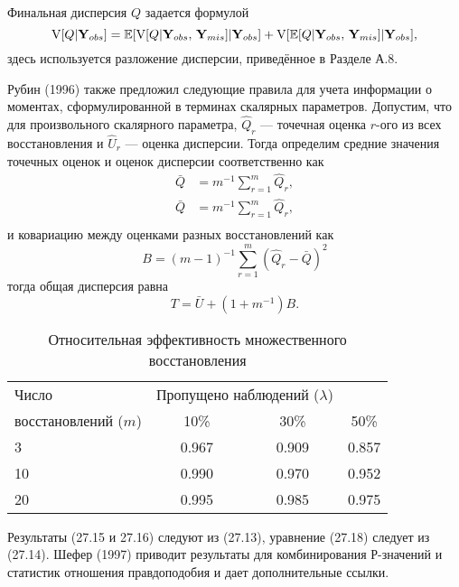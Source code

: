 Финальная дисперсия $Q$ задается формулой
\begin{equation}
\mathrm{V}[Q|\mathbf{Y}_{obs}]=\mathbb{E}[\mathrm{V}[Q|\mathbf{Y}_{obs}, \, \mathbf{Y}_{mis}]|\mathbf{Y}_{obs}]+ \mathrm{V}[\mathbb{E}[Q|\mathbf{Y}_{obs}, \, \mathbf{Y}_{mis}]|\mathbf{Y}_{obs}],
\end{equation}
здесь используется разложение дисперсии, приведённое в Разделе А.8.

Рубин (1996) также предложил следующие правила для учета информации о моментах, сформулированной в терминах скалярных параметров. Допустим, что для произвольного скалярного параметра, $\widehat{Q}_r$ --- точечная оценка $r$-ого из всех восстановления и $\widehat{U}_r$ --- оценка дисперсии. Тогда определим средние значения точечных оценок и оценок дисперсии соответственно как 
\begin{align}
\bar{Q}&=m^{-1} \sum \limits^{m}_{r=1}\widehat{Q}_r, \\
\bar{Q}&=m^{-1} \sum \limits^{m}_{r=1}\widehat{Q}_r, \\
\end{align}
и ковариацию между оценками разных восстановлений как
\begin{equation}
B=(m-1)^{-1} \sum \limits^{m}_{r=1}(\widehat{Q}_r - \bar{Q})^2
\end{equation}
тогда общая дисперсия равна
\begin{equation}
T=\bar{U}+(1+m^{-1})B.
\end{equation}


\begin{table}[h]
\begin{center}
\caption{\label{tab:27.1} Относительная эффективность множественного восстановления}
\begin{tabular}[t]{lccc}
\hline
\hline
Число & \multicolumn{2}{c}{Пропущено наблюдений ($\lambda$)} \\
восстановлений ($m$) & 10\% & 30\% & 50\% \\
\hline
3  &  0.967 & 0.909 & 0.857 \\
10 &  0.990 & 0.970 & 0.952 \\
20 &  0.995 & 0.985 & 0.975 \\
\hline
\hline
\end{tabular}
\end{center}
\end{table}




Результаты (27.15 и 27.16) следуют из (27.13), уравнение (27.18) следует из (27.14). Шефер (1997) приводит результаты для комбинирования $Р$-значений и статистик отношения правдоподобия и дает дополнительные ссылки.

